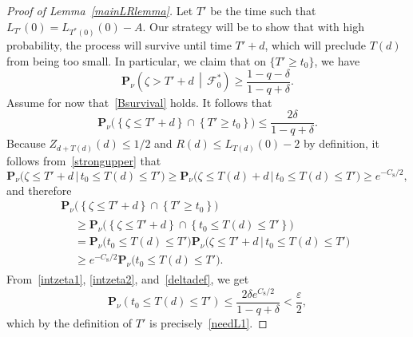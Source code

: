 \documentclass[10pt]{amsart}
\theoremstyle{definition}\newtheorem{defi}[theo]{Definition}\newtheorem{rema}[theo]{Remark}\newtheorem{exam}[theo]{Example}\newtheorem{exem}[theo]{Example}\newtheorem{nota}[theo]{Notation}
\newcommand*\eps{\varepsilon}
\renewcommand*\P{\mathbf{P}}
\newcommand\F{\mathcal{F}}
\newcommand{\1} {\mathds{1}}
\begin{document}
\begin{proof}[Proof of Lemma~\ref{mainLRlemma}]
Let $T'$ be the time such that $L_{T'}(0) = L_{T^*(0)}(0) - A$. Our strategy will be to show that with high probability, the process will survive until time $T' + d$, which will preclude $T(d)$ from being too small. In particular, we claim that on $\{T' \geq t_0\}$, we have
\begin{equation}\label{Bsurvival}
\P_{\nu}\left(\zeta > T' + d\,\middle|\,\F_0^*\right) \geq \frac{1 - q - \delta}{1 - q + \delta}.
\end{equation}
Assume for now that~\eqref{Bsurvival} holds. It follows that
\begin{equation}\label{intzeta1}
\P_{\nu}\big(\left\{\zeta \leq T' + d\right\} \cap \left\{T' \geq t_0\right\}\big) \leq \frac{2 \delta}{1 - q + \delta}.
\end{equation}
Because $Z_{d + T(d)}(d) \leq 1/2$ and $R(d) \leq L_{T(d)}(0) - 2$ by definition, it follows from~\eqref{strongupper} that
\[
\P_{\nu}\big(\zeta \leq T' + d\,\big|\,t_0 \leq T(d) \leq T'\big) \geq \P_{\nu}\big(\zeta \leq T(d) + d\,\big|\,t_0 \leq T(d) \leq T'\big) \geq e^{-C_8/2},
\]
and therefore
\begin{multline}\label{intzeta2}
\P_{\nu}\big(\left\{\zeta \leq T' + d\right\} \cap \left\{T' \geq t_0\right\}\big)\\
\begin{aligned}
&\geq \P_{\nu}\big(\left\{\zeta \leq T' + d\right\} \cap \left\{t_0 \leq T(d) \leq T'\right\}\big) \\
&= \P_{\nu}\big(t_0 \leq T(d) \leq T'\big) \P_{\nu}\big(\zeta \leq T' + d \,\big|\, t_0 \leq T(d) \leq T'\big) \\
&\geq e^{-C_8/2} \P_{\nu}\big(t_0 \leq T(d) \leq T'\big).
\end{aligned}
\end{multline}
From~\eqref{intzeta1}, \eqref{intzeta2}, and~\eqref{deltadef}, we get
\[
\P_{\nu}\left(t_0 \leq T(d) \leq T'\right) \leq \frac{2 \delta e^{C_8/2}}{1 - q + \delta} < \frac{\eps}{2},
\]
which by the definition of $T'$ is precisely~\eqref{needL1}.


\end{proof}
\end{document}
